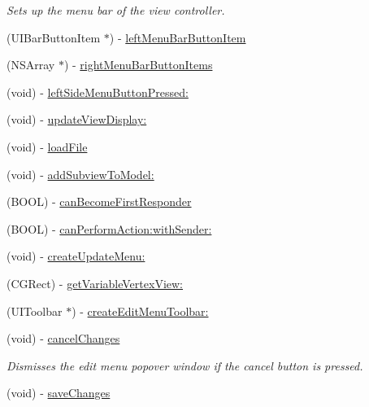 \begin{DoxyCompactItemize}
\begin{DoxyCompactList}\small\item\em Sets up the menu bar of the view controller. \end{DoxyCompactList}\item 
(U\-I\-Bar\-Button\-Item $\ast$) -\/ \hyperlink{interface_view_controller_afb11718c8a0c6f7abd85dfbc7adb1cd1}{left\-Menu\-Bar\-Button\-Item}
\item 
(N\-S\-Array $\ast$) -\/ \hyperlink{interface_view_controller_a78c969d7bca3de65268ac706059e291c}{right\-Menu\-Bar\-Button\-Items}
\item 
(void) -\/ \hyperlink{interface_view_controller_a738b842dc5261f08da93880f0b006b55}{left\-Side\-Menu\-Button\-Pressed\-:}
\item 
(void) -\/ \hyperlink{interface_view_controller_ae806a41483e90f4716ccec06343c2cdd}{update\-View\-Display\-:}
\item 
(void) -\/ \hyperlink{interface_view_controller_a0c84a6ef9750c434993f666f5825c5d7}{load\-File}
\item 
(void) -\/ \hyperlink{interface_view_controller_aaf3fc320c9bc72bd6924fa99bca2f3be}{add\-Subview\-To\-Model\-:}
\item 
(B\-O\-O\-L) -\/ \hyperlink{interface_view_controller_ade65ba8ae784e35b1f2b23a55afbbf9b}{can\-Become\-First\-Responder}
\item 
(B\-O\-O\-L) -\/ \hyperlink{interface_view_controller_a4a5338d3a62ac53d52a2b31880b6802c}{can\-Perform\-Action\-:with\-Sender\-:}
\item 
(void) -\/ \hyperlink{interface_view_controller_a8a501e57528492cf6ba20c9c966282e0}{create\-Update\-Menu\-:}
\item 
(C\-G\-Rect) -\/ \hyperlink{interface_view_controller_a3ce01e8eb3a6a32185225e1bfa51454d}{get\-Variable\-Vertex\-View\-:}
\item 
(U\-I\-Toolbar $\ast$) -\/ \hyperlink{interface_view_controller_a6a24750238ea3d59bb706b8d46e1f4c4}{create\-Edit\-Menu\-Toolbar\-:}
\item 
\hypertarget{interface_view_controller_af83e0aaf6bdf67b4a539d3974ddd6ff5}{(void) -\/ \hyperlink{interface_view_controller_af83e0aaf6bdf67b4a539d3974ddd6ff5}{cancel\-Changes}}\label{interface_view_controller_af83e0aaf6bdf67b4a539d3974ddd6ff5}

\begin{DoxyCompactList}\small\item\em Dismisses the edit menu popover window if the cancel button is pressed. \end{DoxyCompactList}\item 
\hypertarget{interface_view_controller_acb15a33593297fd02f940207a504f2a7}{(void) -\/ \hyperlink{interface_view_controller_acb15a33593297fd02f940207a504f2a7}{save\-Changes}}\label{interface_view_controller_acb15a33593297fd02f940207a504f2a7}


\end{DoxyCompactItemize}
